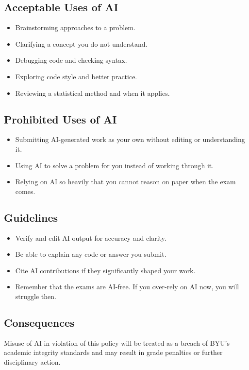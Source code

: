 \documentclass[11pt]{article}
\begin{document}
\subsection*{Acceptable Uses of AI}
\begin{itemize}[topsep=2pt,itemsep=1pt]
\item Brainstorming approaches to a problem.
\item Clarifying a concept you do not understand.
\item Debugging code and checking syntax.
\item Exploring code style and better practice.
\item Reviewing a statistical method and when it applies.
\end{itemize}

\subsection*{Prohibited Uses of AI}
\begin{itemize}[topsep=2pt,itemsep=1pt]
\item Submitting AI-generated work as your own without editing or understanding it.
\item Using AI to solve a problem for you instead of working through it.
\item Relying on AI so heavily that you cannot reason on paper when the exam comes.
\end{itemize}

\subsection*{Guidelines}
\begin{itemize}[topsep=2pt,itemsep=1pt]
\item Verify and edit AI output for accuracy and clarity.
\item Be able to explain any code or answer you submit.
\item Cite AI contributions if they significantly shaped your work.
\item Remember that the exams are AI-free. If you over-rely on AI now, you will struggle then.
\end{itemize}

\subsection*{Consequences}

Misuse of AI in violation of this policy will be treated as a breach of BYU's academic integrity
standards and may result in grade penalties or further disciplinary action.
\end{document}
